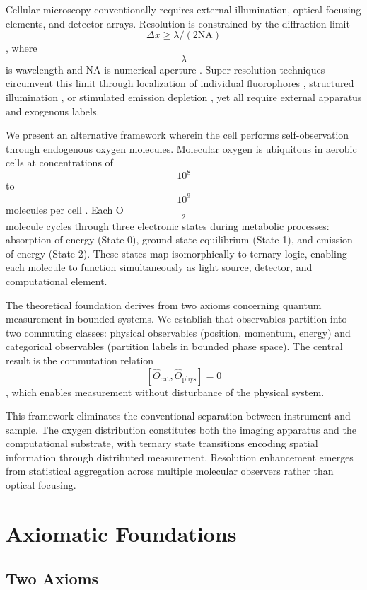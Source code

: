 \documentclass[twocolumn,10pt]{article}
\begin{document}
Cellular microscopy conventionally requires external illumination, optical focusing elements, and detector arrays. Resolution is constrained by the diffraction limit $$\Delta x \geq \lambda / (2\text{NA})$$, where $$\lambda$$ is wavelength and NA is numerical aperture \cite{Abbe1873}. Super-resolution techniques circumvent this limit through localization of individual fluorophores \cite{Betzig2006}, structured illumination \cite{Gustafsson2000}, or stimulated emission depletion \cite{Hell1994}, yet all require external apparatus and exogenous labels.

We present an alternative framework wherein the cell performs self-observation through endogenous oxygen molecules. Molecular oxygen is ubiquitous in aerobic cells at concentrations of $$10^8$$ to $$10^9$$ molecules per cell \cite{Chance1965}. Each O$$_2$$ molecule cycles through three electronic states during metabolic processes: absorption of energy (State 0), ground state equilibrium (State 1), and emission of energy (State 2). These states map isomorphically to ternary logic, enabling each molecule to function simultaneously as light source, detector, and computational element.

The theoretical foundation derives from two axioms concerning quantum measurement in bounded systems. We establish that observables partition into two commuting classes: physical observables (position, momentum, energy) and categorical observables (partition labels in bounded phase space). The central result is the commutation relation $$[\hat{O}_{\text{cat}}, \hat{O}_{\text{phys}}] = 0$$, which enables measurement without disturbance of the physical system.

This framework eliminates the conventional separation between instrument and sample. The oxygen distribution constitutes both the imaging apparatus and the computational substrate, with ternary state transitions encoding spatial information through distributed measurement. Resolution enhancement emerges from statistical aggregation across multiple molecular observers rather than optical focusing.

\section{Axiomatic Foundations}

\subsection{Two Axioms}
\end{document}
